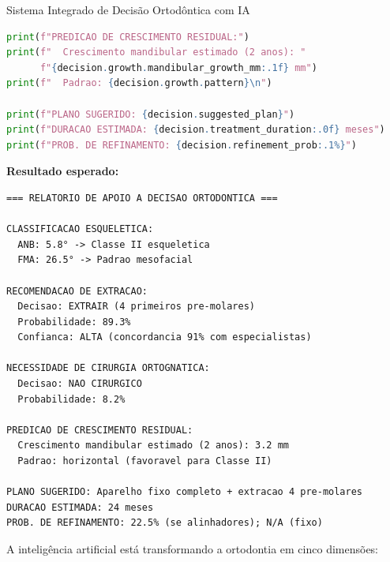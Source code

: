 \begin{pratica}{Sistema Integrado de Decisão Ortodôntica com IA}
\begin{lstlisting}[language=Python, caption={Sistema de suporte à decisão ortodôntica integrado}]
print(f"PREDICAO DE CRESCIMENTO RESIDUAL:")
print(f"  Crescimento mandibular estimado (2 anos): "
      f"{decision.growth.mandibular_growth_mm:.1f} mm")
print(f"  Padrao: {decision.growth.pattern}\n")

print(f"PLANO SUGERIDO: {decision.suggested_plan}")
print(f"DURACAO ESTIMADA: {decision.treatment_duration:.0f} meses")
print(f"PROB. DE REFINAMENTO: {decision.refinement_prob:.1%}")
\end{lstlisting}

\textbf{Resultado esperado:}
\begin{lstlisting}[style=saida]
=== RELATORIO DE APOIO A DECISAO ORTODONTICA ===

CLASSIFICACAO ESQUELETICA:
  ANB: 5.8° -> Classe II esqueletica
  FMA: 26.5° -> Padrao mesofacial

RECOMENDACAO DE EXTRACAO:
  Decisao: EXTRAIR (4 primeiros pre-molares)
  Probabilidade: 89.3%
  Confianca: ALTA (concordancia 91% com especialistas)

NECESSIDADE DE CIRURGIA ORTOGNATICA:
  Decisao: NAO CIRURGICO
  Probabilidade: 8.2%

PREDICAO DE CRESCIMENTO RESIDUAL:
  Crescimento mandibular estimado (2 anos): 3.2 mm
  Padrao: horizontal (favoravel para Classe II)

PLANO SUGERIDO: Aparelho fixo completo + extracao 4 pre-molares
DURACAO ESTIMADA: 24 meses
PROB. DE REFINAMENTO: 22.5% (se alinhadores); N/A (fixo)
\end{lstlisting}
\end{pratica}


A inteligência artificial está transformando a ortodontia em cinco dimensões:

